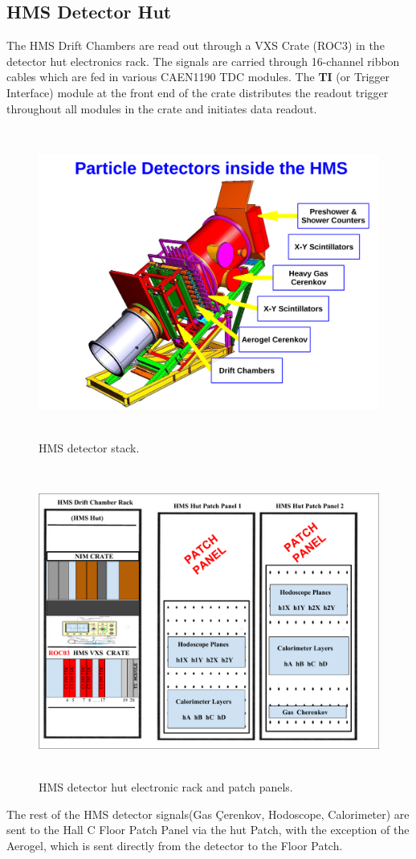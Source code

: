 \documentclass[11pt]{article}
\begin{document}
\subsection{HMS Detector Hut}
The HMS Drift Chambers are read out through a VXS Crate (ROC3) in the detector hut electronics rack. The signals are carried through 16-channel ribbon cables
which are fed in various CAEN1190 TDC modules. The \textbf{TI} (or Trigger Interface) module at the front end of the crate distributes the readout
trigger throughout all modules in the crate and initiates data readout.
\begin{figure}[h!]
  \centering
  \includegraphics[width=5.0in, height=4.0in]{HMS_stack.pdf}
  \caption{HMS detector stack.}
  \label{fig:hms_stack}
\end{figure}
\begin{figure}[h]
  \centering
  \includegraphics[width=5.0in, height=4.0in]{HMS_Hut_Rack.pdf}
  \caption{HMS detector hut electronic rack and patch panels.}
  \label{fig:hms_hut_rack}
\end{figure}
The rest of the HMS detector signals(Gas \c{C}erenkov, Hodoscope, Calorimeter) are sent to the Hall C Floor Patch Panel via the hut Patch, with the exception
of the Aerogel, which is sent directly from the detector to the Floor Patch.
\end{document}
